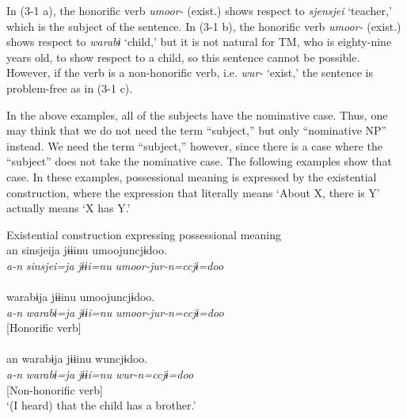 In (3-1 a), the honorific verb \textit{umoor-} (exist.\HON) shows respect to \textit{sjensjei} ‘teacher,’ which is the subject of the sentence. In (3-1 b), the honorific verb \textit{umoor-} (exist.\HON) shows respect to \textit{warabɨ} ‘child,’ but it is not natural for TM, who is eighty-nine years old, to show respect to a child, so this sentence cannot be possible. However, if the verb is a non-honorific verb, i.e. \textit{wur-} ‘exist,’ the sentence is problem-free as in (3-1 c).

In the above examples, all of the subjects have the nominative case. Thus, one may think that we do not need the term “subject,” but only “nominative NP” instead. We need the term “subject,” however, since there is a case where the “subject” does not take the nominative case. The following examples show that case. In these examples, possessional meaning is expressed by the existential construction, where the expression that literally means ‘About X, there is Y’ actually means ‘X has Y.’

{\smallex
\ea Existential construction expressing possessional meaning
 \hfill\relax[El: 120924] \\ 
        \gllll   an  {sinsjeija}  {jɨɨinu}  {umoojuncjɨdoo.}\\
                 {\itshape a-n}  {\itshape sinsjei=ja}  {\itshape jɨɨi=nu}  {\itshape umoor-jur-n=ccjɨ=doo}\\
                 [{\DIST-\ADNZ}  {teacher]=\TOP}  {brother=\NOM}  {[exist.\HON-\UMRK-\PTCP]=\QT=\ASS}\\
                 {[Subject]} {} {}   {[Honorific verb]}\\
    \glt ‘(I heard) that the teacher has a brother.’\\\relax
         [lit. ‘(I heard) that about the teacher, there is a brother.’]
 \hfill\relax [El: 120924] \\
        {warabɨja}  {jɨɨinu}  {umoojuncjɨdoo.}\\
                   {\itshape a-n}  {\itshape warabɨ=ja}  {\itshape jɨɨi=nu}  {\itshape umoor-jur-n=ccjɨ=doo}\\
                   [{\DIST-\ADNZ}  {child]=\TOP}  {brother=\NOM}  {[exist.\HON-\UMRK-\PTCP]=\QT=\ASS}\\
                   [Subject]   {}   {}   {[Honorific verb]}\\
\hfill\relax[El: 120924] \\
\gllll an  {warabɨja}  {jɨɨinu}  {wuncjɨdoo.}\\
   {\itshape a-n}  {\itshape warabɨ=ja}  {\itshape jɨɨi=nu}  {\itshape wur-n=ccjɨ=doo}\\
   [{\DIST-\ADNZ}  {child]=\TOP}  {brother=\NOM}  {[exist-\PTCP]=\QT=\ASS}\\
   [Subject] {} {}     {[Non-honorific verb]}\\
   \glt ‘(I heard) that the child has a brother.’ \\\\
\z
\z} 

